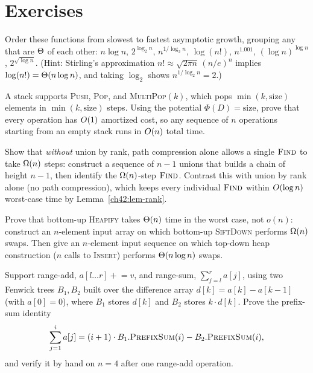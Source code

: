 \section{Exercises}
\label{ch42:exercises}

\begin{exercise}
Order these functions from slowest to fastest asymptotic growth, grouping any that are $\Theta$ of each other:
$n\log n$, $2^{\log_2 n}$, $n^{1/\log_2 n}$, $\log(n!)$, $n^{1.001}$, $(\log n)^{\log n}$,
$2^{\sqrt{\log n}}$. (Hint: Stirling's approximation $n! \approx \sqrt{2\pi n}\,(n/e)^n$ implies $\log(n!) = \Theta(n\log n)$, and taking $\log_2$ shows $n^{1/\log_2 n} = 2$.)
\end{exercise}

\begin{exercise}
A stack supports \textsc{Push}, \textsc{Pop}, and \textsc{MultiPop}$(k)$, which pops $\min(k, \text{size})$ elements in $\min(k, \text{size})$ steps. Using the potential $\Phi(D) = \text{size}$, prove that every operation has $O(1)$ amortized cost, so any sequence of $n$ operations starting from an empty stack runs in $O(n)$ total time.
\end{exercise}

\begin{exercise}
Show that \emph{without} union by rank, path compression alone allows a single $\textsc{Find}$ to take $\Omega(n)$ steps: construct a sequence of $n-1$ unions that builds a chain of height $n-1$, then identify the $\Omega(n)$-step $\textsc{Find}$. Contrast this with union by rank alone (no path compression), which keeps every individual $\textsc{Find}$ within $O(\log n)$ worst-case time by Lemma~\ref{ch42:lem-rank}.
\end{exercise}

\begin{exercise}
Prove that bottom-up \textsc{Heapify} takes $\Theta(n)$ time in the worst case, not $o(n)$: construct an $n$-element input array on which bottom-up \textsc{SiftDown} performs $\Omega(n)$ swaps. Then give an $n$-element input sequence on which top-down heap construction ($n$ calls to \textsc{Insert}) performs $\Theta(n\log n)$ swaps.
\end{exercise}

\begin{exercise}
\label{ch42:ex-fenwick-range}
Support range-add, $a[l\dots r] \mathrel{+}= v$, and range-sum, $\sum_{j=l}^r a[j]$, using two Fenwick trees $B_1, B_2$ built over the difference array $d[k] = a[k] - a[k-1]$ (with $a[0]=0$), where $B_1$ stores $d[k]$ and $B_2$ stores $k \cdot d[k]$. Prove the prefix-sum identity
\[
  \sum_{j=1}^i a[j] = (i+1)\cdot B_1.\textsc{PrefixSum}(i) - B_2.\textsc{PrefixSum}(i),
\]
and verify it by hand on $n=4$ after one range-add operation.
\end{exercise}

